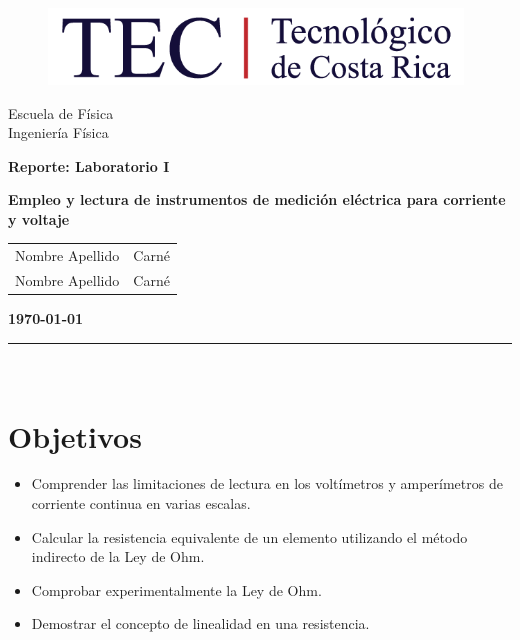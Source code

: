 \documentclass[12pt,letterpaper]{article}
\newcommand{\obj}{Objetivos}
\begin{document}
\begin{titlepage}

\begin{center}
\vspace*{-0.5in}
\begin{figure}[htb]
\begin{center}
\includegraphics[width=11cm]{fig/comunes/logo.png}
\end{center}
\end{figure}
\vspace*{0.4in}
\begin{Huge}
Escuela de Física\\
\vspace*{0.15in}
Ingeniería Física\\
\vspace*{0.8in}
\end{Huge}
\vspace*{0.2in}
\begin{Large}
\textbf{Reporte: Laboratorio I} \\
\end{Large}
\textbf{Empleo y lectura de instrumentos de medición eléctrica para corriente y voltaje}
\vspace*{0.3in}\\
\begin{center}
    \begin{tabular}{c|c}
        Nombre Apellido & Carné  \\
        Nombre Apellido & Carné
    \end{tabular}
\end{center}
\vspace*{2.5in}
\begin{Large}
\textbf{\today}\\
\end{Large}
\rule{80mm}{0.1mm}\\
\vspace*{0.1in}
\end{center}

\end{titlepage}

\tableofcontents
\newpage

\section{\obj}
\begin{itemize}
\item Comprender las limitaciones de lectura en los voltímetros y amperímetros de corriente continua en varias escalas.
\item Calcular la resistencia equivalente de un elemento utilizando el método indirecto de la Ley de Ohm.
\item	Comprobar experimentalmente la Ley de Ohm.
\item	Demostrar el concepto de linealidad en una resistencia.
\end{itemize}
\end{document}
